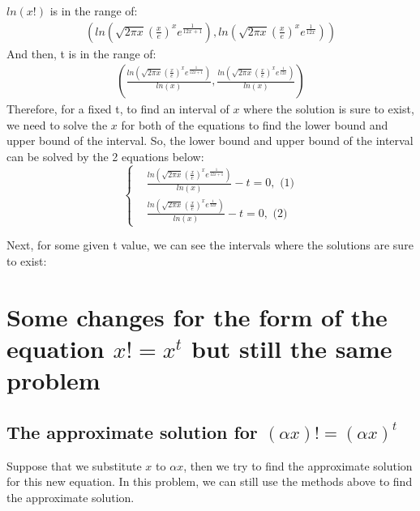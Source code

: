\documentclass{article}
\begin{document}
        $ln(x!)$ is in the range of:
            \begin{align*}
                (ln(\sqrt{2\pi x} (\frac{x}{e})^x e^{\frac{1}{12x+1}}),ln(\sqrt{2\pi x} (\frac{x}{e})^x e^{\frac{1}{12x}}))
            \end{align*}
        And then, t is in the range of:\\
            \begin{align*}
                (\frac{ln(\sqrt{2\pi x} (\frac{x}{e})^x e^{\frac{1}{12x+1}})}{ln(x)},\frac{ln(\sqrt{2\pi x} (\frac{x}{e})^x e^{\frac{1}{12x}})}{ln(x)})
            \end{align*}
        Therefore, for a fixed t, to find an interval of $x$ where the solution is sure to exist, we need to solve the $x$ for both of the equations to find the lower bound and upper bound of the interval.
        So, the lower bound and upper bound of the interval can be solved by the 2 equations below:
            $$\left\{\begin{matrix}
            &\frac{ln(\sqrt{2\pi x} (\frac{x}{e})^x e^{\frac{1}{12x+1}})}{ln(x)} - t = 0, \text{ (1)} \\ 
            & \frac{ln(\sqrt{2\pi x} (\frac{x}{e})^x e^{\frac{1}{12x}})}{ln(x)} - t = 0, \text{ (2)} 
        \end{matrix}\right.$$

        Next, for some given t value, we can see the intervals where the solutions are sure to exist: \\
        \section{Some changes for the form of the equation $x! = x ^ {t}$ but still the same problem}
        \subsection{The approximate solution for $(\alpha x)! = (\alpha x) ^ t$}
        Suppose that we substitute $x$ to $\alpha x$, then we try to find the approximate solution for this new equation. In this problem, we can still use the methods above to find the approximate solution.\\
\end{document}
